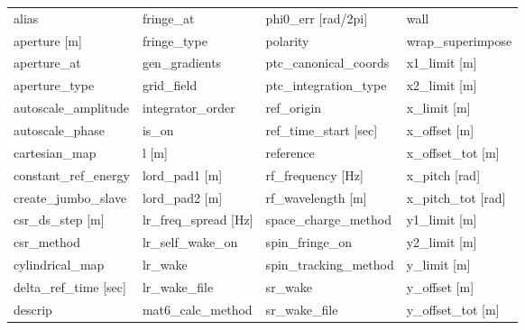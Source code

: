  \begin{tabular}{llll} \toprule
alias                            & fringe_at                        & phi0_err [rad/2pi]               & wall                             \\
aperture [m]                     & fringe_type                      & polarity                         & wrap_superimpose                 \\
aperture_at                      & gen_gradients                    & ptc_canonical_coords             & x1_limit [m]                     \\
aperture_type                    & grid_field                       & ptc_integration_type             & x2_limit [m]                     \\
autoscale_amplitude              & integrator_order                 & ref_origin                       & x_limit [m]                      \\
autoscale_phase                  & is_on                            & ref_time_start [sec]             & x_offset [m]                     \\
cartesian_map                    & l [m]                            & reference                        & x_offset_tot [m]                 \\
constant_ref_energy              & lord_pad1 [m]                    & rf_frequency [Hz]                & x_pitch [rad]                    \\
create_jumbo_slave               & lord_pad2 [m]                    & rf_wavelength [m]                & x_pitch_tot [rad]                \\
csr_ds_step [m]                  & lr_freq_spread [Hz]              & space_charge_method              & y1_limit [m]                     \\
csr_method                       & lr_self_wake_on                  & spin_fringe_on                   & y2_limit [m]                     \\
cylindrical_map                  & lr_wake                          & spin_tracking_method             & y_limit [m]                      \\
delta_ref_time [sec]             & lr_wake_file                     & sr_wake                          & y_offset [m]                     \\
descrip                          & mat6_calc_method                 & sr_wake_file                     & y_offset_tot [m]                 \\

\end{tabular}
